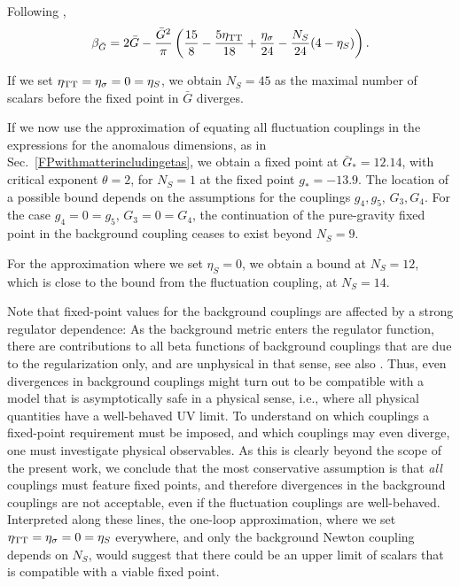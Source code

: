 \documentclass[11pt]{book} %
\newcommand{\bea}{\begin{eqnarray}}
\newcommand{\eea}{\end{eqnarray}}
\numberwithin{equation}{chapter}
\begin{document}
Following \cite{Percacci:2015wwa},
\bea
\beta_{\bar{G}}=2 \bar{G}
- \frac{\bar{G}^2}{\pi} \left(\frac{15}{8}
- \frac{5 \eta_{\rm TT}}{18 }
+ \frac{\eta_{\sigma}}{24}
-  \frac{N_S}{24} (4 - \eta_{S})\right).
\eea

If we set $\eta_{\rm TT}= \eta_{\sigma}=0=\eta_S$, we obtain $N_S=45$ as the maximal
number of scalars before the fixed point in $\bar{G}$ diverges.

If we now use the approximation of equating all fluctuation couplings in the expressions
for the anomalous dimensions, as in Sec.~\ref{FPwithmatterincludingetas},
we obtain a fixed point at $\bar{G}_{\ast}=12.14$, with critical exponent $\theta=2$,
for $N_S=1$  at the fixed point $g_{\ast}=-13.9$.
 The location of a possible bound depends on the assumptions for the couplings $g_4, g_5$, $G_3, G_4$.
 For the case $g_4=0=g_5$, $G_3=0=G_4$,
 the continuation of the pure-gravity fixed point in the background coupling ceases to exist beyond $N_S=9$.

For the approximation where we set $\eta_S=0$, we obtain a bound at $N_S=12$,
which is close to the bound from the fluctuation coupling, at $N_S=14$.

Note that fixed-point values for the background couplings are affected by a strong regulator dependence:
As the background metric enters the regulator function,
there are contributions to all beta functions of background couplings that are due to the regularization only,
and are unphysical in that sense, see also \cite{Folkerts:2011jz, Litim:2002ce, Litim:2002hj, Bridle:2013sra}.
Thus, even divergences in background couplings might turn out to be compatible with a model that
is asymptotically safe in a physical sense, i.e., where all physical quantities have a well-behaved UV limit.
To understand on which couplings a fixed-point requirement must be imposed,
and which couplings may even diverge, one must investigate physical observables.
As this is clearly beyond the scope of the present work, we conclude that the most conservative
assumption is that \emph{all} couplings must feature fixed points,
and therefore divergences in the background couplings are not acceptable,
even if the fluctuation couplings are well-behaved. Interpreted along these lines,
the one-loop approximation, where we set $\eta_{\rm TT}=\eta_{\sigma}=0=\eta_S$ everywhere,
and only the background Newton coupling depends on $N_S$,
would suggest that there could be an upper limit of scalars that is compatible with a viable fixed point.
\end{document}
